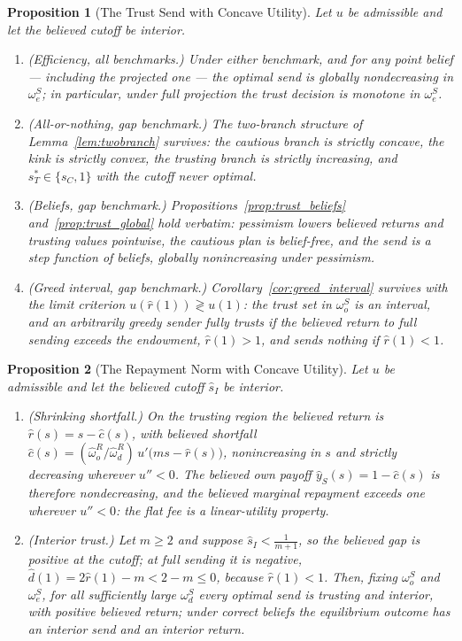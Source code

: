 \documentclass[11pt]{article}
\theoremstyle{plain}
\newtheorem{proposition}{Proposition}
\theoremstyle{remark}
\begin{document}
\begin{proposition}[The Trust Send with Concave Utility]
\label{prop:robust_trust}
Let $u$ be admissible and let the believed cutoff be interior.
\begin{enumerate}[topsep=2pt,itemsep=2pt]
\item \emph{(Efficiency, all benchmarks.)}  Under either benchmark, and for any point belief --- including the projected one --- the optimal send is globally nondecreasing in $\omega_e^S$; in particular, under full projection the trust decision is monotone in $\omega_e^S$.
\item \emph{(All-or-nothing, gap benchmark.)}  The two-branch structure of Lemma~\ref{lem:twobranch} survives: the cautious branch is strictly concave, the kink is strictly convex, the trusting branch is strictly increasing, and $s_T^\ast\in\{s_C,1\}$ with the cutoff never optimal.
\item \emph{(Beliefs, gap benchmark.)}  Propositions~\ref{prop:trust_beliefs} and~\ref{prop:trust_global} hold verbatim: pessimism lowers believed returns and trusting values pointwise, the cautious plan is belief-free, and the send is a step function of beliefs, globally nonincreasing under pessimism.
\item \emph{(Greed interval, gap benchmark.)}  Corollary~\ref{cor:greed_interval} survives with the limit criterion $u(\hat r(1))\gtrless u(1)$: the trust set in $\omega_o^S$ is an interval, and an arbitrarily greedy sender fully trusts if the believed return to full sending exceeds the endowment, $\hat r(1)>1$, and sends nothing if $\hat r(1)<1$.
\end{enumerate}
\end{proposition}

\begin{proposition}[The Repayment Norm with Concave Utility]
\label{prop:robust_norms}
Let $u$ be admissible and let the believed cutoff $\hat s_I$ be interior.
\begin{enumerate}[topsep=2pt,itemsep=2pt]
\item \emph{(Shrinking shortfall.)}  On the trusting region the believed return is $\hat r(s)=s-\hat c(s)$, with believed shortfall $\hat c(s)=(\hat\omega_o^{R}/\hat\omega_d^{R})\,u'\big(ms-\hat r(s)\big)$, nonincreasing in $s$ and strictly decreasing wherever $u''<0$.  The believed own payoff $\hat y_S(s)=1-\hat c(s)$ is therefore nondecreasing, and the believed marginal repayment exceeds one wherever $u''<0$: the flat fee is a linear-utility property.
\item \emph{(Interior trust.)}  Let $m\ge2$ and suppose $\hat s_I<\tfrac1{m+1}$, so the believed gap is positive at the cutoff; at full sending it is negative, $\hat d(1)=2\hat r(1)-m<2-m\le0$, because $\hat r(1)<1$.  Then, fixing $\omega_o^S$ and $\omega_e^S$, for all sufficiently large $\omega_d^S$ every optimal send is trusting and \emph{interior}, with positive believed return; under correct beliefs the equilibrium outcome has an interior send and an interior return.
\end{enumerate}
\end{proposition}
\end{document}
